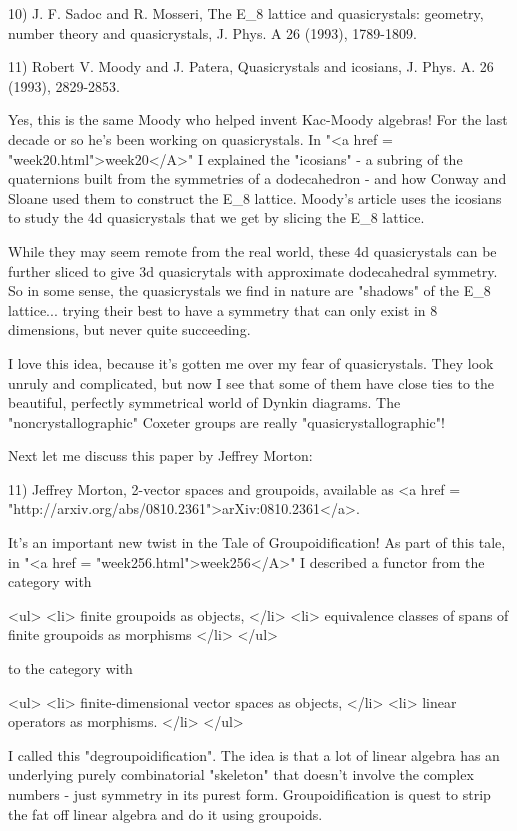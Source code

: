 10) J. F. Sadoc and R. Mosseri, The E_{8} lattice and
quasicrystals: geometry, number theory and quasicrystals, J. Phys. A
26 (1993), 1789-1809.

11) Robert V. Moody and J. Patera, Quasicrystals and icosians, 
J. Phys. A. 26 (1993), 2829-2853. 

Yes, this is the same Moody who helped invent Kac-Moody algebras!  For
the last decade or so he's been working on quasicrystals.  In "<a
href = "week20.html">week20</A>" I explained the
"icosians" - a subring of the quaternions built from the
symmetries of a dodecahedron - and how Conway and Sloane used them to
construct the E_{8} lattice.  Moody's article uses the
icosians to study the 4d quasicrystals that we get by slicing the
E_{8} lattice.

While they may seem remote from the real world, these 4d quasicrystals
can be further sliced to give 3d quasicrytals with approximate
dodecahedral symmetry.  So in some sense, the quasicrystals we find
in nature are "shadows" of the E_{8}
lattice... trying their best to have a symmetry that can only exist in
8 dimensions, but never quite succeeding.

I love this idea, because it's gotten me over my fear of
quasicrystals.  They look unruly and complicated, but now I see that
some of them have close ties to the beautiful, perfectly symmetrical
world of Dynkin diagrams.  The "noncrystallographic" Coxeter
groups are really "quasicrystallographic"!

Next let me discuss this paper by Jeffrey Morton:

11) Jeffrey Morton, 2-vector spaces and groupoids, available as 
<a href = "http://arxiv.org/abs/0810.2361">arXiv:0810.2361</a>.

It's an important new twist in the Tale of Groupoidification!  As
part of this tale, in "<a href = "week256.html">week256</A>"
I described a functor from the category with

<ul>
<li>
finite groupoids as objects, 
</li>
<li>
equivalence classes of spans of finite groupoids as morphisms
</li>
</ul>

to the category with

<ul>
<li>
finite-dimensional vector spaces as objects,
</li>
<li>
linear operators as morphisms.
</li>
</ul>

I called this "degroupoidification".  The idea is that a lot
of linear algebra has an underlying purely combinatorial
"skeleton" that doesn't involve the complex numbers - just
symmetry in its purest form.  Groupoidification is quest to strip the
fat off linear algebra and do it using groupoids.

